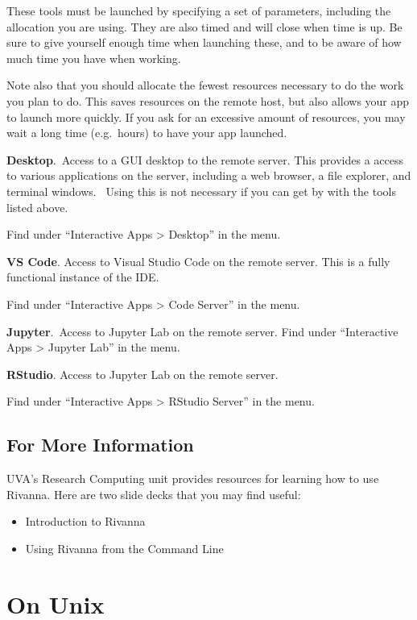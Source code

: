 \documentclass[
  letterpaper,
  DIV=11,
  numbers=noendperiod]{scrreport}
\providecommand{\tightlist}{%
  \setlength{\itemsep}{0pt}\setlength{\parskip}{0pt}}\usepackage{longtable,booktabs,array}
\begin{document}
These tools must be launched by specifying a set of parameters,
including the allocation you are using. They are also timed and will
close when time is up. Be sure to give yourself enough time when
launching these, and to be aware of how much time you have when working.

Note also that you should allocate the fewest resources necessary to do
the work you plan to do. This saves resources on the remote host, but
also allows your app to launch more quickly. If you ask for an excessive
amount of resources, you may wait a long time (e.g.~hours) to have your
app launched.

\textbf{Desktop}.~Access to a GUI desktop to the remote server. This
provides a access to various applications on the server, including a web
browser, a file explorer, and terminal windows.~ Using this is not
necessary if you can get by with the tools listed above.

Find under ``Interactive Apps \textgreater{} Desktop'' in the menu.

\textbf{VS Code}. Access to Visual Studio Code on the remote server.
This is a fully functional instance of the IDE.

Find under ``Interactive Apps \textgreater{} Code Server'' in the menu.

\textbf{Jupyter}.~Access to Jupyter Lab on the remote server. Find under
``Interactive Apps \textgreater{} Jupyter Lab'' in the menu.

\textbf{RStudio}. Access to Jupyter Lab on the remote server.

Find under ``Interactive Apps \textgreater{} RStudio Server'' in the
menu.

\hypertarget{for-more-information}{%
\section{For More Information}\label{for-more-information}}

UVA's Research Computing unit provides resources for learning how to use
Rivanna. Here are two slide decks that you may find useful:

\begin{itemize}
\tightlist
\item
  Introduction to Rivanna
\item
  Using Rivanna from the Command Line
\end{itemize}

\hypertarget{on-unix}{%
\chapter{On Unix}\label{on-unix}}
\end{document}
